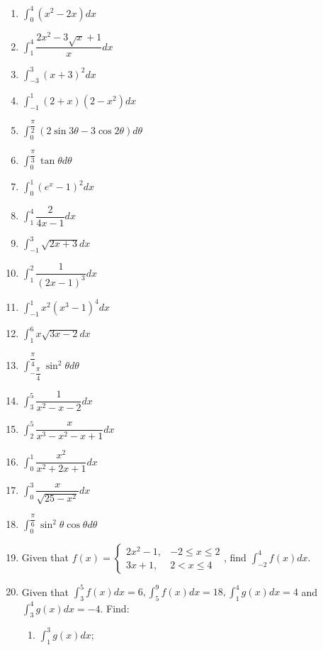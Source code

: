 \documentclass{report}
\begin{document}
\begin{enumerate}
    \item $\displaystyle\int_0^4\left(x^2-2 x\right) d x$
    \item $\displaystyle\int_1^4 \dfrac{2 x^2-3 \sqrt{x}+1}{x} d x$
    \item $\displaystyle\int_{-3}^3(x+3)^2 d x$
    \item $\displaystyle\int_{-1}^1(2+x)\left(2-x^2\right) d x$
    \item $\displaystyle\int_0^{\dfrac{\pi}{2}}(2 \sin 3 \theta-3 \cos 2 \theta) d \theta$
    \item $\displaystyle\int_0^{\dfrac{\pi}{3}} \tan \theta d \theta$
    \item $\displaystyle\int_0^1\left(e^x-1\right)^2 d x$
    \item $\displaystyle\int_1^4 \dfrac{2}{4 x-1} d x$
    \item $\displaystyle\int_{-1}^3 \sqrt{2 x+3} d x$
    \item $\displaystyle\int_1^2 \dfrac{1}{(2 x-1)^3} d x$
    \item $\displaystyle\int_{-1}^1 x^2\left(x^3-1\right)^4 d x$
    \item $\displaystyle\int_1^6 x \sqrt{3 x-2} d x$
    \item $\displaystyle\int_{-\dfrac{\pi}{4}}^{\dfrac{\pi}{4}} \sin ^2 \theta d \theta$
    \item $\displaystyle\int_3^5 \dfrac{1}{x^2-x-2} d x$
    \item $\displaystyle\int_2^5 \dfrac{x}{x^3-x^2-x+1} d x$
    \item $\displaystyle\int_0^1 \dfrac{x^2}{x^2+2 x+1} d x$
    \item $\displaystyle\int_0^3 \dfrac{x}{\sqrt{25-x^2}} d x$
    \item $\displaystyle\int_0^{\dfrac{\pi}{6}} \sin ^2 \theta \cos \theta d \theta$
    \item Given that $f(x)=\left\{\begin{array}{cc}2 x^2-1, & -2 \leq x \leq 2 \\ 3 x+1, & 2<x \leq 4\end{array}\right.$, find $\displaystyle\int_{-2}^4 f(x) d x$.
    \item Given that $\displaystyle\int_3^5 f(x) d x=6, \int_5^9 f(x) d x=18, \int_1^4
              g(x) d x=4$ and $\displaystyle\int_3^4 g(x) d x=-4$. Find:
          \begin{enumerate}
              \item $\displaystyle\int_1^3 g(x) d x$;

\end{enumerate}
\end{enumerate}
\end{document}
